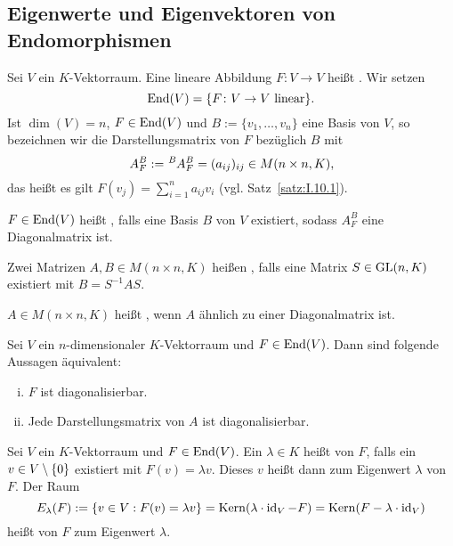 \subsection{Eigenwerte und Eigenvektoren von Endomorphismen}

\setcounter{satz}{1}
\begin{definition}
	\label{def:I.16.2}
	Sei $V$ ein $K$-Vektorraum.
	Eine lineare Abbildung $F \colon V \rightarrow V$ heißt .
	Wir setzen
	\[
		\operatorname{End}(V) = \{F \colon V \rightarrow V \text{ linear}\}.
	\]
	Ist $\dim(V) = n$, $F \in \operatorname{End}(V)$ und $B := \{v_1,\dots,v_n\}$ eine Basis von $V$, so bezeichnen wir die Darstellungsmatrix von $F$ bezüglich $B$ mit
	\[
		\mat{A}{}{B}{F} := \mat{A}{B}{B}{F} = (a_{ij})_{ij} \in M(n \times n,K),
	\]
	das heißt es gilt $F(v_j) = \sum\limits_{i=1}^{n} a_{ij}v_i$ (vgl. Satz~\ref{satz:I.10.1}).
	
	$F \in \operatorname{End}(V)$ heißt , falls eine Basis $B$ von $V$ existiert, sodass $A^B_F$ eine Diagonalmatrix ist.
\end{definition}

\begin{definition}
	\label{def:I.16.3}
	Zwei Matrizen $A,B \in M(n \times n,K)$ heißen , falls eine Matrix $S \in \operatorname{GL}(n,K)$ existiert mit $B = S^{-1}AS$.
	
	$A \in M(n\times n,K)$ heißt , wenn $A$ ähnlich zu einer Diagonalmatrix ist.
\end{definition}

\begin{satz}
	\label{satz:I.16.4}
	Sei $V$ ein $n$-dimensionaler $K$-Vektorraum und $F \in \operatorname{End}(V)$.
	Dann sind folgende Aussagen äquivalent:
	\begin{enumerate}[(i)]
		\item $F$ ist diagonalisierbar.
		\item Jede Darstellungsmatrix von $A$ ist diagonalisierbar.
	\end{enumerate}
\end{satz}

\setcounter{satz}{6}
\begin{definition}
	\label{def:I.16.7}
	Sei $V$ ein $K$-Vektorraum und $F \in \operatorname{End}(V)$.
	Ein $\lambda \in K$ heißt  von $F$, falls ein $v \in V \setminus \{0\}$ existiert mit $F(v) = \lambda v$.
	Dieses $v$ heißt dann  zum Eigenwert $\lambda$ von $F$.
	Der Raum
	\[
		E_\lambda(F) := \{v \in V : F(v) = \lambda v\} = \operatorname{Kern}(\lambda \cdot \operatorname{id}_V - F) = \operatorname{Kern}(F - \lambda \cdot \operatorname{id}_V)
	\]
	heißt  von $F$ zum Eigenwert $\lambda$.
\end{definition}

